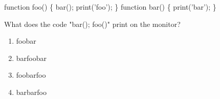  function foo() \{ 
 bar(); 
 print('foo'); 
 \} 
 function bar() \{ 
print('bar'); 
 \} 

 What does the code "bar(); foo()"  print on the monitor? \begin{enumerate}  \item foobar \item barfoobar \item foobarfoo \item barbarfoo \end{enumerate} 
